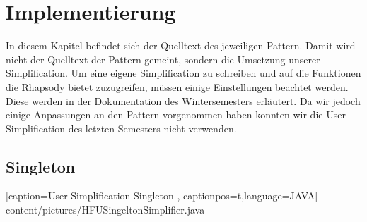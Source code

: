 \chapter{Implementierung}

In diesem Kapitel befindet sich der Quelltext des jeweiligen Pattern. Damit wird
nicht der Quelltext der Pattern gemeint, sondern die Umsetzung unserer
Simplification. Um eine eigene Simplification zu schreiben und auf die
Funktionen die Rhapsody bietet zuzugreifen, müssen einige Einstellungen
beachtet werden. Diese werden in der Dokumentation des Wintersemesters
erläutert. Da wir jedoch einige Anpassungen an den Pattern vorgenommen haben
konnten wir die User-Simplification des letzten Semesters nicht verwenden. 

\section{Singleton}

    [caption={User-Simplification Singleton}
       \label{lst:javaclass},
       captionpos=t,language=JAVA]
 {content/pictures/HFUSingeltonSimplifier.java} 

